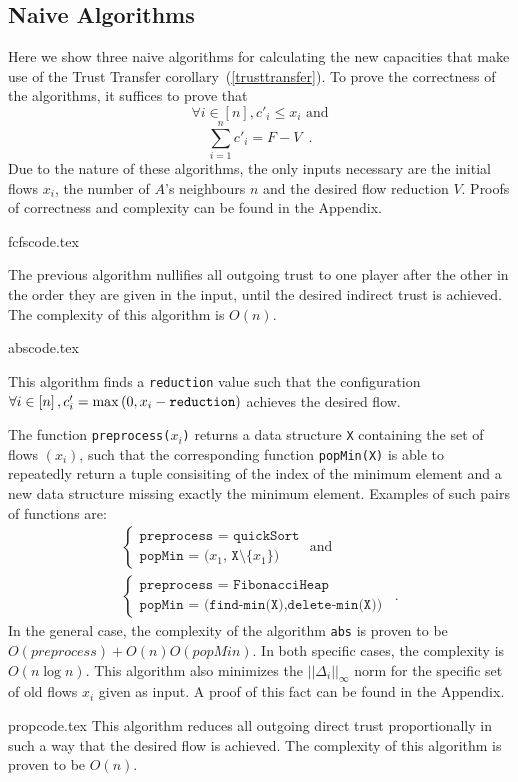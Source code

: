 \subsection{Naive Algorithms}
  Here we show three naive algorithms for calculating the new capacities that make use of the Trust Transfer
  corollary~(\ref{trusttransfer}). To prove the correctness of the algorithms, it suffices to prove that
  \begin{equation}
  \label{naive:req1}
     \forall i \in [n], c'_i \leq x_i \mbox{ and}
  \end{equation}
  \begin{equation}
  \label{naive:req2}
     \sum\limits_{i=1}^{n}c'_i = F - V \enspace.
  \end{equation}
  Due to the nature of these algorithms, the only inputs necessary are the initial flows $x_i$, the number of $A$'s neighbours
  $n$ and the desired flow reduction $V$. Proofs of correctness and complexity can be found in the Appendix.

  {fcfscode.tex}

  The previous algorithm nullifies all outgoing trust to one player after the other in the order they are given in the input,
  until the desired indirect trust is achieved. The complexity of this algorithm is $O\left(n\right)$.

  {abscode.tex}

  This algorithm finds a \texttt{reduction} value such that the configuration $\forall i \in \left[n\right], c'_i =
  \max{\left(0, x_i - \mbox{\texttt{reduction}}\right)}$ achieves the desired flow.

  The function \texttt{preprocess(}$x_i$\texttt{)} returns a data structure \texttt{X} containing the set of flows
  $\left(x_i\right)$, such that the corresponding function \texttt{popMin(X)} is able to repeatedly return a tuple
  consisiting of the index of the minimum element and a new data structure missing exactly the minimum element.
  Examples of such pairs of functions are:
  \begin{equation*}
  \begin{gathered}
    \begin{cases}
      \texttt{preprocess = quickSort} \\
      \texttt{popMin = (}x_1\texttt{, X}\setminus \{x_1\}\texttt{)}
    \end{cases}
    \mbox{ and} \\
    \begin{cases}
      \texttt{preprocess = FibonacciHeap} \\
      \texttt{popMin = (find-min(X),delete-min(X))}
    \end{cases} \enspace.
  \end{gathered}
  \end{equation*}
  In the general case, the complexity of the algorithm \texttt{abs} is proven to be
  $O\left(preprocess\right) + O\left(n\right)O\left(popMin\right)$. In both specific cases, the complexity is
  $O\left(n\log{n}\right)$. This algorithm also minimizes the $||\Delta_i||_\infty$ norm for the specific set of old flows
  $x_i$ given as input. A proof of this fact can be found in the Appendix.

  {propcode.tex}
  This algorithm reduces all outgoing direct trust proportionally in such a way that the desired flow is achieved. The
  complexity of this algorithm is proven to be $O\left(n\right)$.
